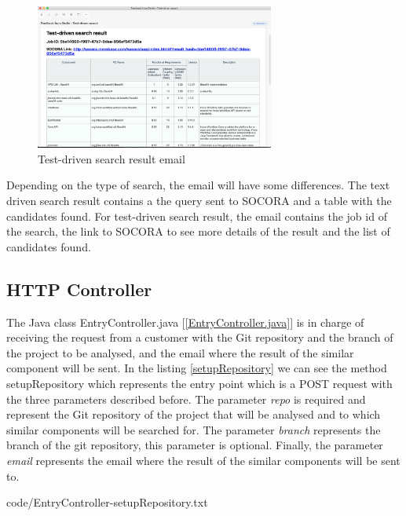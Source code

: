\begin{figure}[H]
	\centering
    \includegraphics[width=0.7\textwidth]{grafiken/email-02}
    \caption{Test-driven search result email}
    \label{fig:email-02}
\end{figure}

Depending on the type of search, the email will have some differences. The text driven search result contains a the query sent to SOCORA and a table with the candidates found. For test-driven search result, the email contains the job id of the search, the link to SOCORA to see more details of the result and the list of candidates found.

\subsection{HTTP Controller}
The Java class EntryController.java [\ref{EntryController.java}] is in charge of receiving the request from a customer with the Git repository and the branch of the project to be analysed, and the email where the result of the similar component will be sent. In the listing \ref{setupRepository} we can see the method setupRepository which represents the entry point which is a POST request with the three parameters described before. The parameter \emph{repo} is required and represent the Git repository of the project that will be analysed and to which similar components will be searched for. The parameter \emph{branch} represents the branch of the git repository, this parameter is optional. Finally, the parameter \emph{email} represents the email where the result of the similar components will be sent to.


{code/EntryController-setupRepository.txt}

